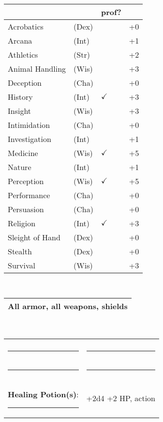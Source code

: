 \documentclass[twocolumn]{article}
\begin{document}
\\
\noindent\begin{tabular}{llll}
 & & prof? & \\
\hline
Acrobatics & (Dex) &  & +0 \\
Arcana & (Int) &  & +1 \\ 
Athletics & (Str) &  & +2\\
Animal Handling & (Wis) &  & +3\\
Deception & (Cha) &  & +0\\
History & (Int) & $\checkmark$ & +3 \\
Insight & (Wis) &  & +3 \\
Intimidation & (Cha) &  & +0 \\
Investigation & (Int) &  & +1 \\
Medicine & (Wis) & $\checkmark$ & +5 \\
Nature & (Int) &  & +1 \\
Perception & (Wis) & $\checkmark$ & +5 \\
Performance & (Cha) &  & +0 \\
Persuasion & (Cha) &  & +0 \\
Religion & (Int) & $\checkmark$ & +3 \\
Sleight of Hand & (Dex) &  & +0 \\
Stealth & (Dex) &  & +0 \\
Survival & (Wis) &  & +3 \\
\hline
\end{tabular}
\vspace{12pt}

\\
\noindent\begin{tabular}{|m{3.1in}|}
\hline
All armor, all weapons, shields \\
\hline
\end{tabular}
\vspace{12pt}


\\
\noindent\begin{tabular}{|ll|}
\hline&\\
\rule{1.4in}{.2pt}&\rule{1.4in}{.2pt}\\
\rule{1.4in}{.2pt}&\rule{1.4in}{.2pt}\\
\textbf{Healing Potion(s)}: \rule{.2in}{.2pt}& +2d4 +2 HP, {\sc action}\\
\hline
\end{tabular}
\vspace{12pt}
\end{document}
